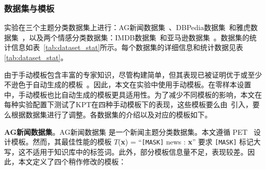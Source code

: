 \subsubsection{数据集与模板}

实验在三个主题分类数据集上进行：AG新闻数据集~\cite{zhang2015character}、DBPedia数据集~\cite{lehmann2015dbpedia}和雅虎数据集~\cite{zhang2015character}，以及两个情感分类数据集：IMDB数据集~\cite{maas2011learning}和亚马逊数据集~\cite{mcauley2013hidden}。数据集的统计信息如表~\ref{tab:dataset_stat}所示。每个数据集的详细信息和统计数据见表\ref{tab:dataset_stat}。

\begin{table}[!htbp]
    \centering
    \caption{KPT使用的各数据集的统计信息}
    \label{tab:dataset_stat}
\end{table}

由于手动模板包含丰富的专家知识，尽管构建简单，但其表现已被证明优于或至少不逊色于自动生成的模板~\cite{gao2020making}。因此，本文在实验中使用手动模板。在零样本设置中，手动模板也比自动生成的模板更具适用性。为了减少不同模板的影响，本文在每种实验配置下测试了KPT在四种手动模板下的表现，这些模板要么由~\cite{schick2020exploiting}引入，要么根据数据集进行了调整。各数据集的介绍以及对应的模板如下。

\textbf{AG新闻数据集}。AG新闻数据集 是一个新闻主题分类数据集。本文遵循 PET~\cite{schick2020exploiting} 设计模板。然而，其最佳性能的模板 $T$(\textbf{x}) =  ``\texttt{[MASK]} news : \textbf{x}'' 要求 \texttt{[MASK]} 标记大写，这不适用于知识库中的标签词。此外，部分模板信息量不足，表现较差。因此，本文定义了四个稍作修改的模板：



